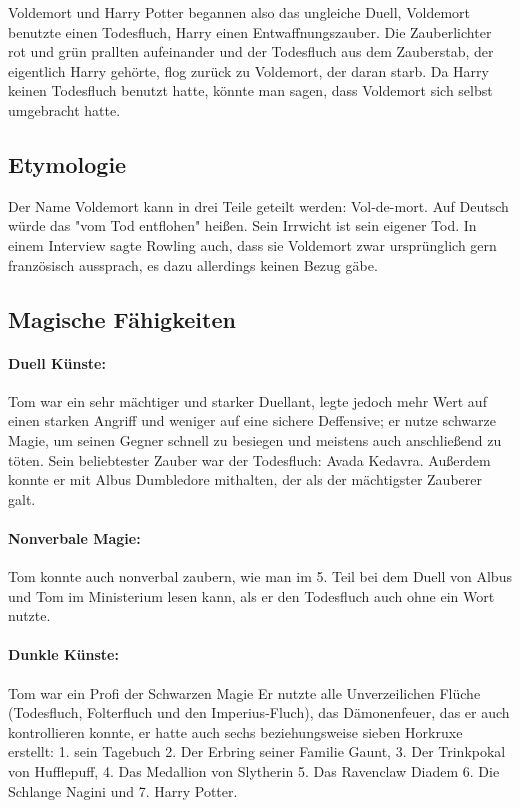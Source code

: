 \documentclass[a4paper, 10pt]{article}
\begin{document}
\vspace{10pt}
\newline
Voldemort und Harry Potter begannen also das ungleiche Duell, Voldemort benutzte einen Todesfluch, Harry einen Entwaffnungszauber. Die Zauberlichter rot und grün prallten aufeinander und der Todesfluch aus dem Zauberstab, der eigentlich Harry gehörte, flog zurück zu Voldemort, der daran starb. Da Harry keinen Todesfluch benutzt hatte, könnte man sagen, dass Voldemort sich selbst umgebracht hatte.

\subsection*{\Large Etymologie}
Der Name Voldemort kann in drei Teile geteilt werden: Vol-de-mort. Auf Deutsch würde das "vom Tod entflohen" heißen.
\vspace{10pt}
\newline
Sein Irrwicht ist sein eigener Tod. In einem Interview sagte Rowling auch, dass sie Voldemort zwar ursprünglich gern französisch aussprach, es dazu allerdings keinen Bezug gäbe.

\subsection*{\Large Magische Fähigkeiten}
\paragraph{Duell Künste:}  
Tom war ein sehr mächtiger und starker Duellant, legte jedoch mehr Wert auf einen starken Angriff und weniger auf eine sichere Deffensive; er nutze schwarze Magie, um seinen Gegner schnell zu besiegen und meistens auch anschließend zu töten. Sein beliebtester Zauber war der Todesfluch: Avada Kedavra. Außerdem konnte er mit Albus Dumbledore mithalten, der als der mächtigster Zauberer galt.
\paragraph{Nonverbale Magie:}  
Tom konnte auch nonverbal zaubern, wie man im 5. Teil bei dem Duell von Albus und Tom im Ministerium lesen kann, als er den Todesfluch auch ohne ein Wort nutzte.
\paragraph{Dunkle Künste:} 
Tom war ein Profi der Schwarzen Magie Er nutzte alle Unverzeilichen Flüche (Todesfluch, Folterfluch und den Imperius-Fluch), das Dämonenfeuer, das er auch kontrollieren konnte, er hatte auch sechs beziehungsweise sieben Horkruxe erstellt: 1. sein Tagebuch 2. Der Erbring seiner Familie Gaunt, 3. Der Trinkpokal von Hufflepuff, 4. Das Medallion von Slytherin 5. Das Ravenclaw Diadem 6. Die Schlange Nagini und 7. Harry Potter.
\end{document}
